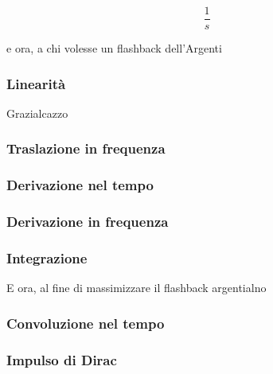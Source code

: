\documentclass[11pt]{article}
\begin{document}
\[ \frac{1}{s} \]


e ora, a chi volesse un flashback dell'Argenti

\subsubsection{Linearità}
\label{sec:org5ae7f5e}

Grazialcazzo

\subsubsection{Traslazione in frequenza}
\label{sec:orgf97182b}

\subsubsection{Derivazione nel tempo}
\label{sec:org7ecdcc6}

\subsubsection{Derivazione in frequenza}
\label{sec:org6ff3975}

\subsubsection{Integrazione}
\label{sec:orga043a82}

E ora, al fine di massimizzare il flashback argentialno

\subsubsection{Convoluzione nel tempo}
\label{sec:org6b551a1}

\subsubsection{Impulso di Dirac}
\label{sec:orgbf6b817}
\end{document}
